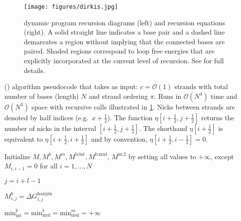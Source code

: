 \begin{figure}[H]
	\centering\texttt{[image: figures/dirkis.jpg]}
	\caption{\snMFE dynamic program recursion diagrams (left) and recursion equations (right). A solid straight line indicates a base pair and
		a dashed line demarcates a region without implying that the connected bases are paired. Shaded regions correspond to loop free energies that are	explicitly incorporated at the current level of recursion. See \cite{dirks2003partition, fornace2020unified} for  full details.  
	}\label{fig:mfe}
\end{figure}



\begin{algorithm}[H] 
	\caption{\small\SymnMFE (\snMFE) algorithm pseudocode  that takes as input: $c=\mathcal{O}(1)$ strands with total number of bases (length) $N$ and strand ordering $\pi$. 
		Runs in  $\mathcal{O}(N^4)$ time and $\mathcal{O}(N^3)$ space with
		recursive calls illustrated in \cref{fig:mfe}. Nicks between strands are denoted by half indices (e.g.~$x+ \frac{1}{2}$). 
		The function $\eta[i+ \frac{1}{2}, j+\frac{1}{2}]$ returns the number of nicks in the interval $[i+ \frac{1}{2}, j+\frac{1}{2}]$. 
		The shorthand $\eta[i+ \frac{1}{2}]$ is equivalent to $\eta[i+ \frac{1}{2}, i+\frac{1}{2}]$ and by convention, $\eta[i+ \frac{1}{2}, i-\frac{1}{2}] =0$.
	} \label{algo:1}
	\begin{algorithmic}[1]
		\footnotesize
		\State Initialize $M, M^b, M^m, M^\text{b:int}, M^\text{b:mul}$,  $M^\text{m:2}$  by setting all values to $+\infty$, except $M_{i,i-1} = 0$ for all $i=1,\ldots,N$
		
		\State $j = i+l-1$
		
		$M_{i,j}^b =\Delta G_{i,j}^\text{hairpin}$
		
		
		
		\EndIf 
		
		\State $\text{min}_\text{int}^b =  \text{min}_\text{mul}^b = \text{min}_\text{mul}^m = +\infty$
		
		
		
		
		

\end{algorithmic}
\end{algorithm}
